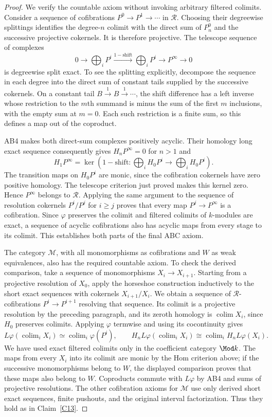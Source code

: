 \begin{proof}
We verify the countable axiom without invoking arbitrary filtered colimits. Consider a sequence of cofibrations $P^0\to P^1\to\cdots$ in $\mathcal R$. Choosing their degreewise splittings identifies the degree-$n$ colimit with the direct sum of $P^0_n$ and the successive projective cokernels. It is therefore projective. The telescope sequence of complexes
\[
 0\longrightarrow\bigoplus_iP^i
 \xrightarrow{1-\mathrm{shift}}\bigoplus_iP^i
 \longrightarrow P^{\infty}\longrightarrow0
\]
is degreewise split exact. To see the splitting explicitly, decompose the sequence in each degree into the direct sum of constant tails supplied by the successive cokernels. On a constant tail $B\xrightarrow{1}B\xrightarrow{1}\cdots$, the shift difference has a left inverse whose restriction to the $m$th summand is minus the sum of the first $m$ inclusions, with the empty sum at $m=0$. Each such restriction is a finite sum, so this defines a map out of the coproduct.

AB4 makes both direct-sum complexes positively acyclic. Their homology long exact sequence consequently gives $H_nP^{\infty}=0$ for $n>1$ and
\[
 H_1P^{\infty}
 =\ker\left(1-\mathrm{shift}:\bigoplus_iH_0P^i
                              \longrightarrow\bigoplus_iH_0P^i\right).
\]
The transition maps on $H_0P^i$ are monic, since the cofibration cokernels have zero positive homology. The telescope criterion just proved makes this kernel zero. Hence $P^{\infty}$ belongs to $\mathcal R$. Applying the same argument to the sequence of resolution cokernels $P^i/P^j$ for $i\geq j$ proves that every map $P^j\to P^{\infty}$ is a cofibration. Since $\varphi$ preserves the colimit and filtered colimits of $k$-modules are exact, a sequence of acyclic cofibrations also has acyclic maps from every stage to its colimit. This establishes both parts of the final ABC axiom.

The category $\mathcal M$, with all monomorphisms as cofibrations and $W$ as weak equivalences, also has the required countable axiom. To check the derived comparison, take a sequence of monomorphisms $X_i\to X_{i+1}$. Starting from a projective resolution of $X_0$, apply the horseshoe construction inductively to the short exact sequences with cokernels $X_{i+1}/X_i$. We obtain a sequence of $\mathcal R$-cofibrations $P^i\to P^{i+1}$ resolving that sequence. Its colimit is a projective resolution by the preceding paragraph, and its zeroth homology is $\operatorname{colim}X_i$, since $H_0$ preserves colimits. Applying $\varphi$ termwise and using its cocontinuity gives
\[
 L\varphi\left(\operatorname{colim}_iX_i\right)
 \simeq \operatorname{colim}_i\varphi(P^i),
 \qquad
 H_nL\varphi\left(\operatorname{colim}_iX_i\right)
 \cong\operatorname{colim}_iH_nL\varphi(X_i).
\]
We have used exact filtered colimits only in the coefficient category $\Mod k$. The maps from every $X_i$ into its colimit are monic by the Hom criterion above; if the successive monomorphisms belong to $W$, the displayed comparison proves that these maps also belong to $W$. Coproducts commute with $L\varphi$ by AB4 and sums of projective resolutions. The other cofibration axioms for $\mathcal M$ use only derived short exact sequences, finite pushouts, and the original interval factorization. Thus they hold as in Claim~\ref{C13}.


\end{proof}
